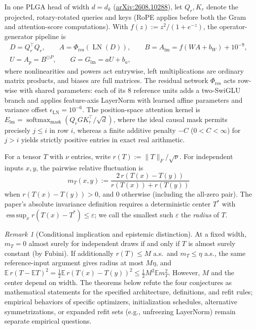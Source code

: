 \documentclass[11pt]{article}
\theoremstyle{plain}
\theoremstyle{definition}
\theoremstyle{remark}
\newtheorem{remark}{Remark}
\DeclareMathOperator{\LN}{LN}
\DeclareMathOperator{\softmax}{softmax}
\begin{document}
In one PLGA head of width $d = d_k$ (\href{https://arxiv.org/abs/2608.10288}{arXiv:2608.10288}), let $Q_r, K_r$ denote the projected, rotary-rotated queries and keys (RoPE applies before both the Gram and attention-score computations). With $f(z) := z^2 / (1 + e^{-z})$, the operator-generator pipeline is
\begin{gather*}
D = Q_r^\top Q_r, \qquad
A = \Phi_{\mathrm{res}}(\LN(D)), \qquad
B = A_{\mathrm{lm}} = f(W A + b_W) + 10^{-9}, \\
U = A_p = B^{\odot P}, \qquad
G = G_{\mathrm{lm}} = a U + b_a,
\end{gather*}
where nonlinearities and powers act entrywise, left multiplications are ordinary matrix products, and biases are full matrices. The residual network $\Phi_{\mathrm{res}}$ acts row-wise with shared parameters: each of its $8$ reference units adds a two-SwiGLU branch and applies feature-axis LayerNorm with learned affine parameters and variance offset $\epsilon_{\mathrm{LN}} = 10^{-6}$.
The position-space attention kernel is $E_{\mathrm{lm}} = \softmax_{\mathrm{mask}}(Q_r G K_r^\top / \sqrt{d})$, where the ideal causal mask permits precisely $j \le i$ in row $i$, whereas a finite additive penalty $-C$ ($0 < C < \infty$) for $j > i$ yields strictly positive entries in exact real arithmetic.

For a tensor $T$ with $\nu$ entries, write $r(T) := \|T\|_F / \sqrt{\nu}$. For independent inputs $x, y$, the pairwise relative fluctuation is
\[
m_T(x, y) := \frac{2\,r(T(x) - T(y))}{r(T(x)) + r(T(y))}
\]
when $r(T(x) - T(y)) > 0$, and $0$ otherwise (including the all-zero pair). The paper's absolute invariance definition requires a deterministic center $T^*$ with $\operatorname{ess\,sup}_x r(T(x) - T^*) \le \varepsilon$; we call the smallest such $\varepsilon$ the \emph{radius} of $T$.

\begin{remark}[Conditional implication and epistemic distinction]
At a fixed width, $m_T = 0$ almost surely for independent draws if and only if $T$ is almost surely constant (by Fubini). If additionally $r(T) \le M$ a.s.\ and $m_T \le \eta$ a.s., the same reference-input argument gives radius at most $M\eta$, and $\mathbb{E}\,r(T - \mathbb{E}T)^2 = \tfrac{1}{2}\mathbb{E}\,r(T(x) - T(y))^2 \le \tfrac{1}{2}M^2 \mathbb{E}m_T^2$. However, $M$ and the center depend on width. The theorems below refute the four conjectures as mathematical statements for the specified architecture, definitions, and refit rules; empirical behaviors of specific optimizers, initialization schedules, alternative symmetrizations, or expanded refit sets (e.g., unfreezing LayerNorm) remain separate empirical questions.
\end{remark}
\end{document}
